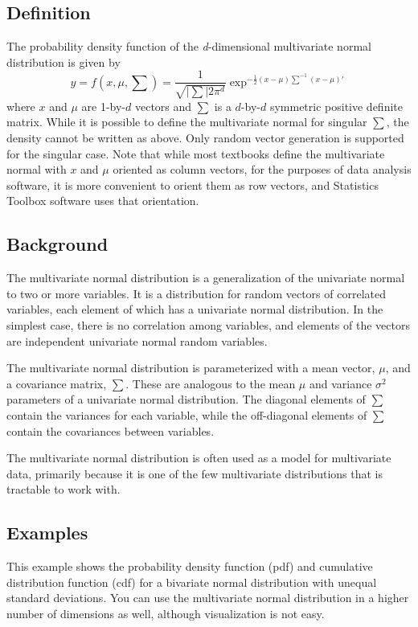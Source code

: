 \documentclass{article}
\begin{document}
\subsection{Definition}
\label{sec:definition-1}
The probability density function of the \emph{d}-dimensional
multivariate normal distribution is given by 
\begin{equation}
  \label{eq:5}
  y=f(x,\mu,\sum)=\frac{1}{\sqrt{|\sum|2\pi^{d}}}\exp^{-\frac{1}{2}(x-\mu)\sum^{-1}(x-\mu)'}
\end{equation}
where $x$ and $\mu$ are 1-by-$d$ vectors and $\sum$ is a $d$-by-$d$
symmetric positive definite matrix. While it is possible to define the
multivariate normal for singular $\sum$, the density cannot be written
as above. Only random vector generation is supported for the singular
case. Note that while most textbooks define the multivariate normal
with $x$ and $\mu$ oriented as column vectors, for the purposes of
data analysis software, it is more convenient to orient them as row
vectors, and Statistics Toolbox software uses that orientation. 

\subsection{Background}
\label{sec:background-1}

The multivariate normal distribution is a generalization of the
univariate normal to two or more variables. It is a distribution for
random vectors of correlated variables, each element of which has a
univariate normal distribution. In the simplest case, there is no
correlation among variables, and elements of the vectors are
independent univariate normal random variables. 
\par
The multivariate normal distribution is parameterized with a mean
vector, $\mu$, and a covariance matrix, $\sum$. These are analogous to
the mean $\mu$ and variance $\sigma^{2}$ parameters of a univariate
normal distribution. The diagonal elements of $\sum$ contain the
variances for each variable, while the off-diagonal elements of $\sum$
contain the covariances between variables. 
\par
The multivariate normal distribution is often used as a model for
multivariate data, primarily because it is one of the few multivariate
distributions that is tractable to work with. 






\subsection{Examples}
\label{sec:examples}
This example shows the probability density function (pdf) and
cumulative distribution function (cdf) for a bivariate normal
distribution with unequal standard deviations. You can use the
multivariate normal distribution in a higher number of dimensions as
well, although visualization is not easy. 
\end{document}
